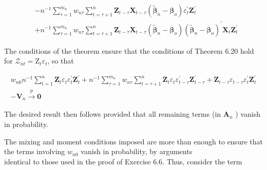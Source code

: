\documentclass[10pt]{article}
\begin{document}
$$\begin{aligned}
& -n^{-1} \sum_{\tau=1}^{m_{n}} w_{n \tau} \sum_{t=\tau+1}^{n} \mathbf{Z}_{t-\tau} \mathbf{X}_{t-\tau}\left(\tilde{\boldsymbol{\beta}}_{n}-\boldsymbol{\beta}_{o}\right) \varepsilon_{t}^{\prime} \mathbf{Z}_{t}^{\prime} \\
& +n^{-1} \sum_{\tau=1}^{m_{n}} w_{n \tau} \sum_{t=\tau+1}^{n} \mathbf{Z}_{t-\tau} \mathbf{X}_{t-\tau}\left(\tilde{\boldsymbol{\beta}}_{n}-\boldsymbol{\beta}_{o}\right)\left(\tilde{\boldsymbol{\beta}}_{n}-\boldsymbol{\beta}_{o}\right)^{\prime} \mathbf{X}_{t} \mathbf{Z}_{t}^{\prime}
\end{aligned}
$$

The conditions of the theorem ensure that the conditions of Theorem 6.20 hold for $\mathcal{Z}_{n t}=\mathrm{Z}_{t} \varepsilon_{t}$, so that

$$
\begin{gathered}
w_{n 0} n^{-1} \sum_{t=1}^{n} \mathbf{Z}_{t} \varepsilon_{t} \varepsilon_{t}^{\prime} \mathbf{Z}_{t}^{\prime}+n^{-1} \sum_{\tau=1}^{m_{n}} w_{n \tau} \sum_{t=\tau+1}^{n} \mathbf{Z}_{t} \varepsilon_{t} \varepsilon_{t-\tau}^{\prime} \mathbf{Z}_{t-\tau}^{\prime}+\mathbf{Z}_{t-\tau} \varepsilon_{t-\tau} \varepsilon_{t}^{\prime} \mathbf{Z}_{t}^{\prime} \\
-\mathbf{V}_{n} \xrightarrow{p} \mathbf{0}
\end{gathered}
$$

The desired result then follows provided that all remaining terms (in $\mathbf{A}_{n}$ ) vanish in probability.

The mixing and moment conditions imposed are more than enough to ensure that the terms involving $w_{n 0}$ vanish in probability, by arguments\\
identical to those used in the proof of Exercise 6.6. Thus, consider the term
\end{document}
